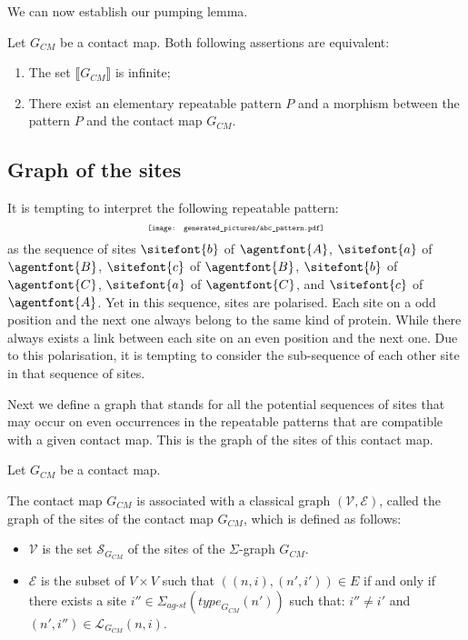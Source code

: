 \documentclass{entcs}
\newcommand{\graphsymb}{G}
\newcommand{\linksite}{\signaturesymb_{\textit{ag-st}}}
\newcommand{\signaturesymb}{\Sigma}
\newcommand{\type}[1][\graphsymb]{\textit{type}_{#1}}
\newcommand{\sites}[1][\graphsymb]{\mathcal{S}_{#1}}
\newcommand{\links}[1][\graphsymb]{\mathcal{L}_{#1}}
\begin{document}
We can now establish our pumping lemma.
\begin{lemma}
Let $\graphsymb_{\textit{CM}}$ be a contact map.
Both following assertions are equivalent:
\begin{enumerate}
  \item The set $\llbracket \graphsymb_{\textit{CM}} \rrbracket$ is infinite;
  \item There exist an elementary repeatable pattern $P$ and a morphism
  between the pattern $P$ and the contact map $\graphsymb_{\textit{CM}}$.
\end{enumerate}
\end{lemma}

\subsection{Graph of the sites}

It is  tempting to interpret the following repeatable pattern:
\begin{equation*}
\scalebox{0.6}{\texttt{[image: generated\_pictures/abc\_pattern.pdf]}}
\end{equation*}
as the sequence of sites $\sitefont{b}$ of $\agentfont{A}$, $\sitefont{a}$ of $\agentfont{B}$, $\sitefont{c}$ of $\agentfont{B}$, $\sitefont{b}$ of $\agentfont{C}$, $\sitefont{a}$ of $\agentfont{C}$, and $\sitefont{c}$ of $\agentfont{A}$. Yet in this sequence, sites are polarised.
Each site on a odd position and the next one always belong to the same kind of protein.
While there always exists a link between each site on an even position and the next one. Due to this polarisation, it is tempting to consider the sub-sequence of each other site in that sequence of sites.

Next we define a graph that stands for all the potential sequences of sites that may occur on even occurrences in the repeatable patterns that are compatible with a given contact map. This is the graph of the sites of this contact map.

\begin{defn}
  Let $\graphsymb_{\textit{CM}}$ be a contact map.

  The contact map $\graphsymb_{\textit{CM}}$ is associated with a classical graph $(\mathcal{V},\mathcal{E})$, called the graph of the sites of the contact map $\graphsymb_{\textit{CM}}$, which is defined as follows:
  \begin{itemize}
    \item $\mathcal{V}$ is the set $\sites[\graphsymb_{\textit{CM}}]$ of the sites of the $\Sigma$-graph $\graphsymb_{\textit{CM}}$.
    \item $\mathcal{E}$ is the subset of $V\times V$ such that
    $((n,i),(n',i'))\in E$ if and only if there exists a site
    $i''\in\linksite(\type[\graphsymb_{\textit{CM}}](n'))$ such that:
    $i'' \neq i'$ and $(n',i'')\in\links[\graphsymb_{\textit{CM}}](n,i)$.
  \end{itemize}
  \end{defn}
\end{document}
